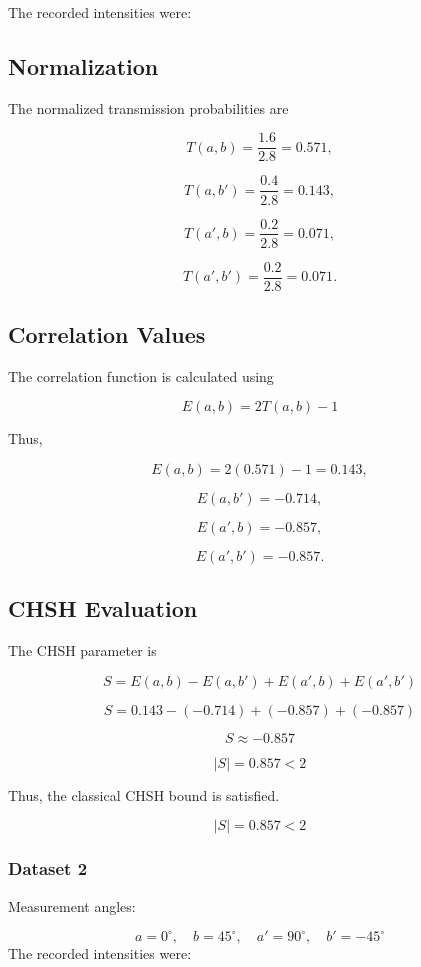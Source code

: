 \documentclass[17pt,a4paper]{extarticle}
\begin{document}
The recorded intensities were:

\subsection{Normalization}

The normalized transmission probabilities are

\[
T(a,b) = \frac{1.6}{2.8} = 0.571,
\]

\[
T(a,b') = \frac{0.4}{2.8} = 0.143,
\]

\[
T(a',b) = \frac{0.2}{2.8} = 0.071,
\]

\[
T(a',b') = \frac{0.2}{2.8} = 0.071.
\]

\subsection{Correlation Values}

The correlation function is calculated using

\[
E(a,b) = 2T(a,b) - 1
\]

Thus,

\[
E(a,b) = 2(0.571) - 1 = 0.143,
\]

\[
E(a,b') = -0.714,
\]

\[
E(a',b) = -0.857,
\]

\[
E(a',b') = -0.857.
\]

\subsection{CHSH Evaluation}

The CHSH parameter is

\[
S = E(a,b) - E(a,b') + E(a',b) + E(a',b')
\]

\[
S = 0.143 - (-0.714) + (-0.857) + (-0.857)
\]

\[
S \approx -0.857
\]

\[
|S| = 0.857 < 2
\]

Thus, the classical CHSH bound is satisfied.

\[
|S| = 0.857 < 2
\]

\subsubsection{Dataset 2}

Measurement angles:

\[
a = 0^\circ, \quad b = 45^\circ, \quad a' = 90^\circ, \quad b' = -45^\circ
\]
The recorded intensities were:
\end{document}
